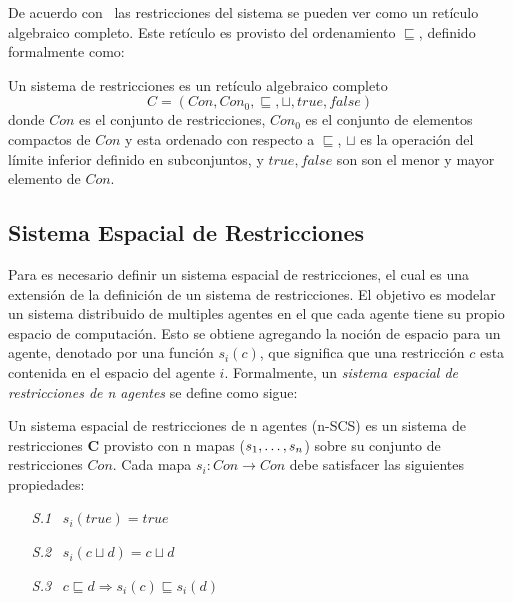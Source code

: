 De acuerdo con~\cite{DEBOER199537} las restricciones del sistema se pueden ver como un ret\'iculo algebraico completo. Este ret\'iculo es provisto del ordenamiento $\sqsubseteq$, definido formalmente como:

\theoremstyle{definition}
\begin{definition}
Un sistema de restricciones es un ret\'iculo algebraico completo \[C = (Con, Con_0, \sqsubseteq, \sqcup, true, false)\] donde $Con$ es el conjunto de restricciones, $Con_0$ es el conjunto de elementos compactos de $Con$ y esta ordenado con respecto a $\sqsubseteq$, $\sqcup$ es la operaci\'on del l\'imite inferior definido en subconjuntos, y $true, false$ son son el menor y mayor elemento de $Con$.
\end{definition}

\subsection{Sistema Espacial de Restricciones}
\label{ser.cap3}

Para \textbf{\SCCP} es necesario definir un sistema espacial de restricciones, el cual es una extensi\'on de la definici\'on de un sistema de restricciones. El objetivo es modelar un sistema distribuido de multiples agentes en el que cada agente tiene su propio espacio de computaci\'on. Esto se obtiene agregando la noci\'on de espacio para un agente, denotado por una funci\'on $s_i(c)$, que significa que una restricci\'on $c$ esta contenida en el espacio del agente $i$. Formalmente, un \textit{sistema espacial de restricciones de n agentes} se define como sigue:

\theoremstyle{definition}
\begin{definition}
Un sistema espacial de restricciones de n agentes (n-SCS) es un sistema de restricciones \textbf{C} provisto con n mapas ($s_1, \mathellipsis,s_n$) sobre su conjunto de restricciones $Con$.  Cada mapa $s_i: Con \rightarrow Con$ debe satisfacer las siguientes propiedades: 
\begin{enumerate} 
	\item [\it{S.1}] \ $s_i(true)=true$
	\item [\it{S.2}] \ $s_i(c\sqcup d)=c\sqcup d$
	\item [\it{S.3}] \ $c \sqsubseteq d \Rightarrow s_i(c) \sqsubseteq s_i(d)$
\end{enumerate}
\end{definition}

